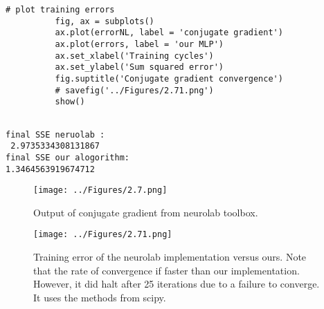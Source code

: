 \documentclass[11pt]{article}
\makeatletter
\def\maxwidth{\ifdim\Gin@nat@width>\linewidth\linewidth
    \else\Gin@nat@width\fi}
\let\Oldincludegraphics\includegraphics
\renewcommand{\includegraphics}[1]{\Oldincludegraphics[width=.8\maxwidth]{#1}}
\makeatother
\begin{document}
\begin{Verbatim}[commandchars=\\\{\}]
          # plot training errors
          fig, ax = subplots()
          ax.plot(errorNL, label = 'conjugate gradient')
          ax.plot(errors, label = 'our MLP')
          ax.set_xlabel('Training cycles')
          ax.set_ylabel('Sum squared error')
          fig.suptitle('Conjugate gradient convergence')
          # savefig('../Figures/2.71.png')
          show()
          
\end{Verbatim}
    \begin{Verbatim}[commandchars=\\\{\}]
final SSE neruolab :
 2.9735334308131867
final SSE our alogorithm:
1.3464563919674712

    \end{Verbatim}
		\begin{figure}[H]
		\centering \texttt{[image: ../Figures/2.7.png]}
		\caption{Output of conjugate gradient from neurolab toolbox.}
		\label{fig:2.7}
	\end{figure}
	
	\begin{figure}[H]
		\centering \texttt{[image: ../Figures/2.71.png]}
		\caption{Training error of the neurolab implementation versus ours. Note that the rate of convergence if faster than our implementation. However, it did halt after 25 iterations due to a failure to converge. It uses the methods from scipy.}
		\label{fig:2.71}
	\end{figure}



    
    
    
    
\end{document}
